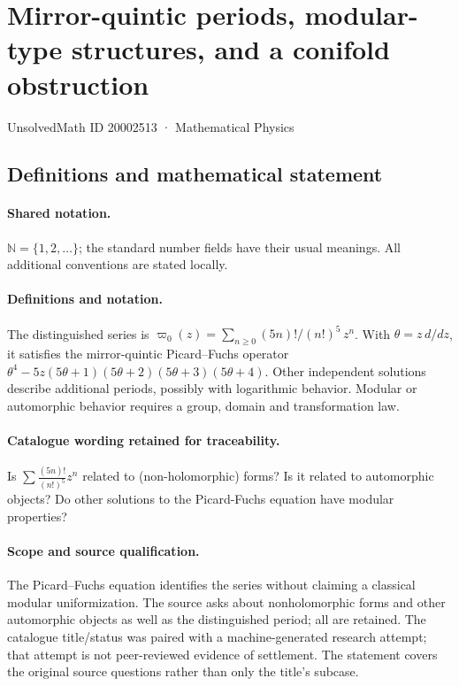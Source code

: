 \documentclass[11pt]{article}
\begin{document}
\setcounter{section}{20002512}
\section{Mirror-quintic periods, modular-type structures, and a conifold obstruction}\label{20002513}
{\small UnsolvedMath ID 20002513 · Mathematical Physics}
\subsection{Definitions and mathematical statement}

\paragraph{Shared notation.}$\mathbb N=\{1,2,\ldots\}$; the standard number fields have their usual meanings. All additional conventions are stated locally.


\paragraph{Definitions and notation.}The distinguished series is $\varpi_0(z)=\sum_{n\ge0}(5n)!/(n!)^5\,z^n$. With $\theta=z\,d/dz$, it satisfies the mirror-quintic Picard--Fuchs operator $\theta^4-5z(5\theta+1)(5\theta+2)(5\theta+3)(5\theta+4)$. Other independent solutions describe additional periods, possibly with logarithmic behavior. Modular or automorphic behavior requires a group, domain and transformation law.

\paragraph{Catalogue wording retained for traceability.}
Is $\sum \frac{(5n)!}{(n!)^5}z^n$ related to (non-holomorphic) forms? Is it related to automorphic objects?
Do other solutions to the Picard-Fuchs equation have modular properties?
\paragraph{Scope and source qualification.}The Picard–Fuchs equation identifies the series without claiming a classical modular uniformization. The source asks about nonholomorphic forms and other automorphic objects as well as the distinguished period; all are retained. The catalogue title/status was paired with a machine-generated research attempt; that attempt is not peer-reviewed evidence of settlement. The statement covers the original source questions rather than only the title’s subcase.
\end{document}
